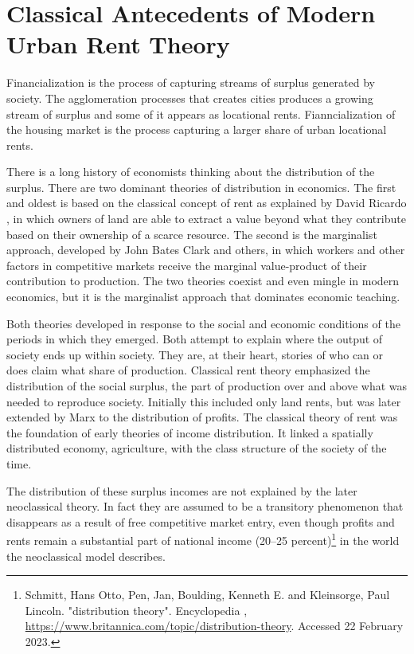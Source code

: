 \chapter{Classical Antecedents of Modern Urban Rent Theory} \label{chapter-rent}



Financialization is the process of capturing streams of surplus generated by society. The agglomeration processes that creates cities produces a growing stream of surplus and some of it appears as locational rents. Fianncialization of the housing market is the process  capturing a larger share of urban locational rents. %

There is a long history of economists thinking about the distribution of the surplus. %
There are two dominant theories of \gls{distribution} in economics. The first and oldest is based on the classical concept of rent as explained  by David Ricardo \cite{ricardoEssayInfluenceLow1815}, in which owners of land are able to extract a value beyond what they contribute based on their ownership of a scarce resource. The second is the marginalist approach, developed by John Bates Clark and others, in which workers and other factors  in competitive markets receive the \gls{marginal value-product} of their contribution to production. The two theories coexist and even mingle in modern economics, but it is the marginalist approach that dominates economic teaching. 

Both theories developed in response to the social and economic conditions of the periods in which they emerged. Both attempt to explain where the output of society ends up within society. They are, at their heart, stories of who  can or does claim what share of production.  Classical rent theory  emphasized the distribution of the social \gls{surplus}, the part of production  over and above what was needed to reproduce society. Initially this included only land rents, but was later extended by Marx to the distribution of profits.
The classical theory of rent was the foundation of early %
theories of income distribution. It linked a spatially distributed economy, agriculture, with the class structure of the society of the time. 

The distribution of these surplus incomes are not explained by the later neoclassical theory. In fact they are assumed to be a transitory phenomenon that disappears as a result of free competitive market entry, even though profits and rents remain a substantial part of national income (20–25 percent)\footnote{Schmitt, Hans Otto, Pen, Jan, Boulding, Kenneth E. and Kleinsorge, Paul Lincoln. "distribution theory". Encyclopedia \cite{Britannica},  \url{https://www.britannica.com/topic/distribution-theory}. Accessed 22 February 2023.} in the world the neoclassical model describes. %

